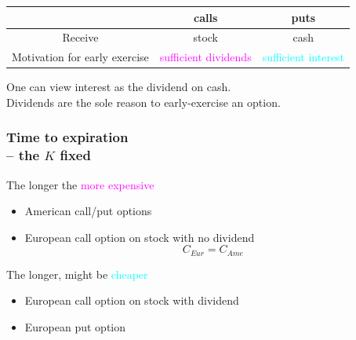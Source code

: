 \begin{frame}[fragile]
	\begin{center}
\renewcommand{\arraystretch}{1.2}
		\begin{tabular}{|c|cc|}
			\hline
                                    & calls                                     & puts                                  \\ \hline
			Receive                       & stock                                     & cash                                  \\
			Motivation for early exercise & \textcolor{magenta}{sufficient dividends} & \textcolor{cyan}{sufficient interest} \\ \hline
		\end{tabular}
		\bigskip
		\bigskip

		One can view interest as the dividend on cash. \\

		\bigskip
		Dividends are the sole reason to early-exercise an option.
	\end{center}
\end{frame}
\begin{frame}[fragile]
	\frametitle{Time to expiration \\  -- the $K$ fixed}
	\begin{center}
		The longer the \textcolor{magenta}{more expensive}
		\bigskip

		\pause
		\begin{minipage}{0.7\textwidth}
			\begin{itemize}
				\item American call/put options
				\item European call option on stock with no dividend
					\begin{equation*}
						C_{Eur} = C_{Ame}
					\end{equation*}
			\end{itemize}
		\end{minipage}
	\end{center}

	\pause
	\mySeparateLine
	\bigskip
	\begin{center}
		The longer, might be \textcolor{cyan}{cheaper}
		\bigskip

		\pause
		\begin{minipage}{0.7\textwidth}
			\begin{itemize}
				\item European call option on stock with dividend
				\item European put option
			\end{itemize}
		\end{minipage}
	\end{center}
\end{frame}
